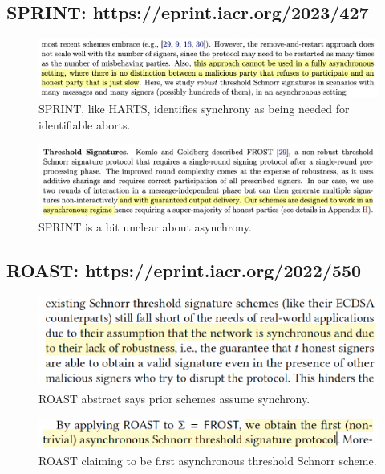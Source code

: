 \newpage

\subsection{SPRINT: https://eprint.iacr.org/2023/427}

\begin{figure}
    \centering
    \includegraphics[width=1\linewidth]{images/SPRINT_IA.png}
    \caption{SPRINT, like HARTS, identifies synchrony as being needed for identifiable aborts.}
\end{figure}

\begin{figure}
    \centering
    \includegraphics[width=1\linewidth]{images/SPRINT_FROST.png}
    \caption{SPRINT is a bit unclear about asynchrony.}
\end{figure}

\newpage

\subsection{ROAST: https://eprint.iacr.org/2022/550}

\begin{figure}
    \centering
    \includegraphics[width=1\linewidth]{images/ROAST_abstract.png}
    \caption{ROAST abstract says prior schemes assume synchrony.}
\end{figure}

\begin{figure}
    \centering
    \includegraphics[width=1\linewidth]{images/ROAST_first_async.png}
    \caption{ROAST claiming to be first asynchronous threshold Schnorr scheme.}
\end{figure}

